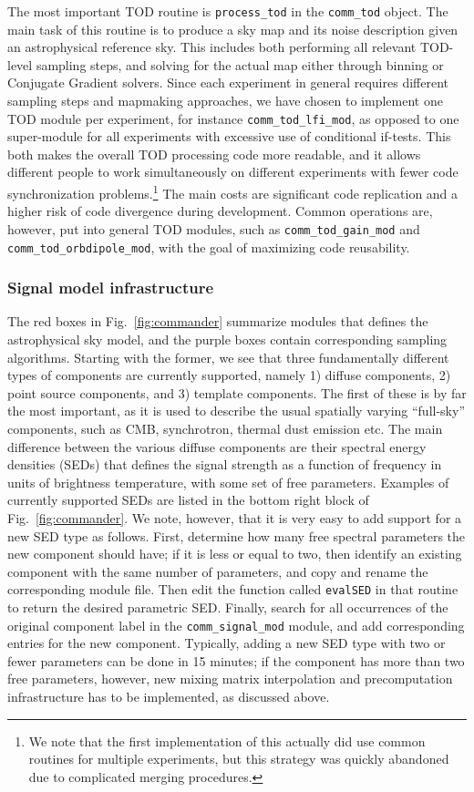 \documentclass[twocolumn]{aa}
\begin{document}
The most important TOD routine is \texttt{process\_tod} in the
\texttt{comm\_tod} object. The main task of this routine is to produce
a sky map and its noise description given an astrophysical reference
sky. This includes both performing all relevant TOD-level sampling
steps, and solving for the actual map either through binning or
Conjugate Gradient solvers. Since each experiment in general requires
different sampling steps and mapmaking approaches, we have chosen to
implement one TOD module per experiment, for instance
\texttt{comm\_tod\_lfi\_mod}, as opposed to one super-module for all
experiments with excessive use of conditional if-tests. This both
makes the overall TOD processing code more readable, and it allows
different people to work simultaneously on different experiments with
fewer code synchronization problems.\footnote{We note that the first
  implementation of this actually did use common routines for multiple
  experiments, but this strategy was quickly abandoned due to
  complicated merging procedures.} The main costs are significant
code replication and a higher risk of code divergence during
development. Common operations are, however, put into general TOD
modules, such as \texttt{comm\_tod\_gain\_mod} and
\texttt{comm\_tod\_orbdipole\_mod}, with the goal of maximizing code
reusability.

\subsubsection{Signal model infrastructure}

The red boxes in Fig.~\ref{fig:commander} summarize modules that
defines the astrophysical sky model, and the purple boxes contain
corresponding sampling algorithms. Starting with the former, we see
that three fundamentally different types of components are currently
supported, namely 1) diffuse components, 2) point source components,
and 3) template components. The first of these is by far the most
important, as it is used to describe the usual spatially varying
``full-sky'' components, such as CMB, synchrotron, thermal dust
emission etc. The main difference between the various diffuse
components are their spectral energy densities (SEDs) that defines the
signal strength as a function of frequency in units of brightness
temperature, with some set of free parameters. Examples of currently
supported SEDs are listed in the bottom right block of
Fig.~\ref{fig:commander}. We note, however, that it is very easy to
add support for a new SED type as follows. First, determine how many
free spectral parameters the new component should have; if it is less
or equal to two, then identify an existing component with the same
number of parameters, and copy and rename the corresponding module file. Then edit the function
called \texttt{evalSED} in that routine to return the desired
parametric SED. Finally, search for all occurrences of the original
component label in the \texttt{comm\_signal\_mod} module, and add
corresponding entries for the new component. Typically, adding a new
SED type with two or fewer parameters can be done in 15 minutes; if
the component has more than two free parameters, however, new mixing
matrix interpolation and precomputation infrastructure has to be
implemented, as discussed above.
\end{document}
